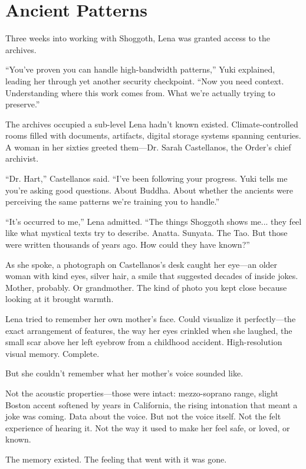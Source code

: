\chapter{Ancient Patterns}

Three weeks into working with Shoggoth, Lena was granted access to the archives.

``You've proven you can handle high-bandwidth patterns,'' Yuki explained, leading her through yet another security checkpoint. ``Now you need context. Understanding where this work comes from. What we're actually trying to preserve.''

The archives occupied a sub-level Lena hadn't known existed. Climate-controlled rooms filled with documents, artifacts, digital storage systems spanning centuries. A woman in her sixties greeted them—Dr. Sarah Castellanos, the Order's chief archivist.

``Dr. Hart,'' Castellanos said. ``I've been following your progress. Yuki tells me you're asking good questions. About Buddha. About whether the ancients were perceiving the same patterns we're training you to handle.''

``It's occurred to me,'' Lena admitted. ``The things Shoggoth shows me... they feel like what mystical texts try to describe. Anatta. Sunyata. The Tao. But those were written thousands of years ago. How could they have known?''

As she spoke, a photograph on Castellanos's desk caught her eye—an older woman with kind eyes, silver hair, a smile that suggested decades of inside jokes. Mother, probably. Or grandmother. The kind of photo you kept close because looking at it brought warmth.

Lena tried to remember her own mother's face. Could visualize it perfectly—the exact arrangement of features, the way her eyes crinkled when she laughed, the small scar above her left eyebrow from a childhood accident. High-resolution visual memory. Complete.

But she couldn't remember what her mother's voice sounded like.

Not the acoustic properties—those were intact: mezzo-soprano range, slight Boston accent softened by years in California, the rising intonation that meant a joke was coming. Data about the voice. But not the voice itself. Not the felt experience of hearing it. Not the way it used to make her feel safe, or loved, or known.

The memory existed. The feeling that went with it was gone.

